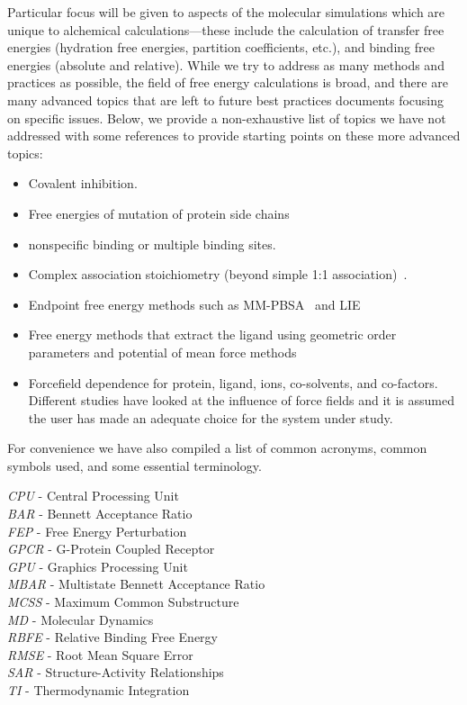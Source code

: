 \documentclass[9pt,bestpractices]{livecoms}
\begin{document}
Particular focus will be given to aspects of the molecular simulations which are unique to alchemical calculations---these include the calculation of transfer free energies (hydration free energies, partition coefficients, etc.), and binding free energies (absolute and relative).
%
While we try to address as many methods and practices as possible, the field of free energy calculations is broad, and there are many advanced topics that are left to future best practices documents focusing on specific issues. 
Below, we provide a non-exhaustive list of topics we have not addressed with some references to provide starting points on these more advanced topics:
\begin{itemize}
\item Covalent inhibition.
\item Free energies of mutation of protein side chains
\item nonspecific binding or multiple binding sites.
\item Complex association stoichiometry (beyond simple 1:1 association)~\cite{awesome reference}.
\item Endpoint free energy methods such as MM-PBSA~\cite{genheden2015mm} and LIE~\cite{gutierrez-de-teran2012linear}
\item Free energy methods that extract the ligand using geometric order parameters and potential of mean force methods~\cite{heinzelmann2017attachpullrelease}
\item Forcefield dependence for protein, ligand, ions, co-solvents, and co-factors. Different studies have looked at the influence of force fields and it is assumed the user has made an adequate choice for the system under study.~\cite{loeffler2018reproducibility, vassetti2019assessment, lopes2015current} 
\end{itemize}
%
For convenience we have also compiled a list of common acronyms, common symbols used, and some essential terminology.
\begin{tcolorbox}[title=Acronyms, colback=blue!10!white]
    \textit{CPU} - Central Processing Unit\\
    \textit{BAR} - Bennett Acceptance Ratio\\
    \textit{FEP} - Free Energy Perturbation\\
    \textit{GPCR} - G-Protein Coupled Receptor\\
    \textit{GPU} - Graphics Processing Unit\\
    \textit{MBAR} - Multistate Bennett Acceptance Ratio\\
    \textit{MCSS} - Maximum Common Substructure\\
    \textit{MD} - Molecular Dynamics\\
    \textit{RBFE} - Relative Binding Free Energy\\
    \textit{RMSE} - Root Mean Square Error\\
    \textit{SAR} - Structure-Activity Relationships\\
    \textit{TI} - Thermodynamic Integration
\end{tcolorbox}
\end{document}
